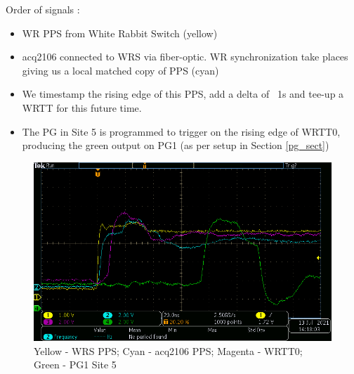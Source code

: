 \documentclass[]{article}
\begin{document}

Order of signals :
\begin{itemize}
	\setlength\itemsep{0pt}
	\item WR PPS from White Rabbit Switch (yellow)
	\item acq2106 connected to WRS via fiber-optic. WR synchronization take places giving us a local matched copy of PPS (cyan)
	\item We timestamp the rising edge of this PPS, add a delta of ~1s and tee-up a WRTT for this future time.
	\item The PG in Site 5 is programmed to trigger on the rising edge of WRTT0, producing the green output on PG1 (as per setup in Section \ref{pg_sect})
\end{itemize}

\begin{figure}[H]
	\centering
	\includegraphics[height=0.5\textwidth]{images/wr_pps_ac_pps_wrtt0_pg}
	\caption{Yellow - WRS PPS; Cyan - acq2106 PPS; Magenta - WRTT0; Green - PG1 Site 5}
	\label{fig:pps_wrtt_pg}
\end{figure}
\end{document}

